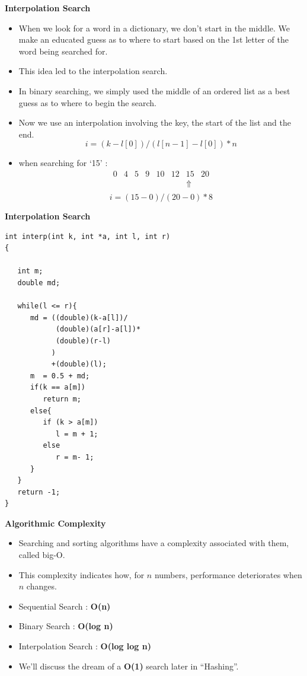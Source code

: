 \documentclass[a4,portraitt]{slides}
\begin{document}
\newpage
{\samepage
\begin{center}
{\Large{\bf Interpolation Search}}
\end{center}
\begin{itemize}
\item When we look for a word in a dictionary, we don't start in the middle.
We make an educated guess as to where to start based on the 1st letter of the
word being searched for.
\item This idea led to the interpolation search.
\item In binary searching, we simply used the middle of an ordered list as a best guess as to where to begin the search.
\item Now we use an interpolation involving the key, the start of the list and the end.
\[
i = (k - l[0])/(l[n-1] - l[0])*n
\]
\item when searching for `15' :
{\small
\[
\begin{array}{cccccccc}
0 & 4 & 5 & 9 & 10 & 12 & 15 & 20\\
&&&&&&\Uparrow&\\
\end{array}
\]
}
\[
i = (15-0)/(20-0)*8
\]
\end{itemize}
}

\newpage
{\samepage
\begin{center}
{\Large{\bf Interpolation Search}}
\end{center}
\begin{verbatim}
int interp(int k, int *a, int l, int r)
{

   int m;
   double md;

   while(l <= r){
      md = ((double)(k-a[l])/
            (double)(a[r]-a[l])*
            (double)(r-l)
           )
           +(double)(l);
      m  = 0.5 + md;
      if(k == a[m])
         return m;
      else{
         if (k > a[m])
            l = m + 1;
         else
            r = m- 1;
      }
   }
   return -1;
}
\end{verbatim}
}

\newpage
{\samepage
\begin{center}
{\Large{\bf Algorithmic Complexity}}
\end{center}
\begin{itemize}
\item Searching and sorting algorithms have a complexity associated with them, called big-O.
\item This complexity indicates how, for $n$ numbers, performance deteriorates when $n$ changes.
\item Sequential Search : {\bf O(n)}
\item Binary Search : {\bf O(log n)}
\item Interpolation Search : {\bf O(log log n)}
\item We'll discuss the dream of a {\bf O(1)} search later in ``Hashing''.
\end{itemize}
}
\end{document}
